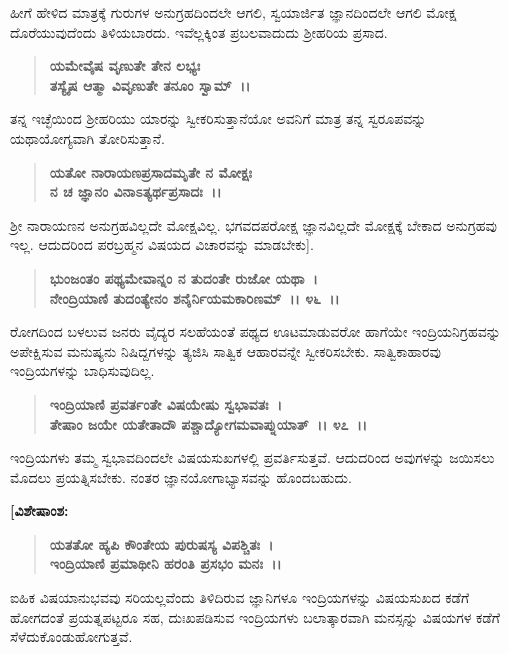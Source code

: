 ಹೀಗೆ ಹೇಳಿದ ಮಾತ್ರಕ್ಕೆ ಗುರುಗಳ ಅನುಗ್ರಹದಿಂದಲೇ ಆಗಲಿ, ಸ್ವಯಾರ್ಜಿತ ಜ್ಞಾನದಿಂದಲೇ ಆಗಲಿ ಮೋಕ್ಷ ದೊರೆಯುವುದೆಂದು ತಿಳಿಯಬಾರದು. ಇವೆಲ್ಲಕ್ಕಿಂತ ಪ್ರಬಲ\-ವಾದುದು ಶ‍್ರೀಹರಿಯ ಪ್ರಸಾದ.

\begin{verse}
\textbf{ಯಮೇವೈಷ ವೃಣುತೇ ತೇನ ಲಭ್ಯಃ}\\\textbf{ತಸ್ಯೈಷ ಆತ್ಮಾ ವಿವೃಣುತೇ ತನೂಂ ಸ್ವಾಮ್~।।} 
\end{verse}

ತನ್ನ ಇಚ್ಛೆಯಿಂದ ಶ‍್ರೀಹರಿಯು ಯಾರನ್ನು ಸ್ವೀಕರಿಸುತ್ತಾನೆಯೋ ಅವನಿಗೆ ಮಾತ್ರ ತನ್ನ ಸ್ವರೂಪವನ್ನು ಯಥಾಯೋಗ್ಯವಾಗಿ ತೋರಿಸುತ್ತಾನೆ.

\begin{verse}
\textbf{ಯತೋ ನಾರಾಯಣಪ್ರಸಾದಮೃತೇ ನ ಮೋಕ್ಷಃ}\\\textbf{ನ ಚ ಜ್ಞಾನಂ ವಿನಾಽತ್ಯರ್ಥಪ್ರಸಾದಃ~।।} 
\end{verse}

ಶ‍್ರೀ ನಾರಾಯಣನ ಅನುಗ್ರಹವಿಲ್ಲದೇ ಮೋಕ್ಷವಿಲ್ಲ. ಭಗವದಪರೋಕ್ಷ ಜ್ಞಾನವಿಲ್ಲದೇ ಮೋಕ್ಷಕ್ಕೆ ಬೇಕಾದ ಅನುಗ್ರಹವು ಇಲ್ಲ. ಆದುದರಿಂದ ಪರಬ್ರಹ್ಮನ ವಿಷಯದ ವಿಚಾರವನ್ನು ಮಾಡಬೇಕು].

\begin{verse}
\textbf{ಭುಂಜಂತಂ ಪಥ್ಯಮೇವಾನ್ನಂ ನ ತುದಂತೇ ರುಜೋ ಯಥಾ~।}\\\textbf{ನೇಂದ್ರಿಯಾಣಿ ತುದಂತ್ಯೇನಂ ಶನೈರ್ನಿಯಮಕಾರಿಣಮ್~।। ೪೬~।।}
\end{verse}

ರೋಗದಿಂದ ಬಳಲುವ ಜನರು ವೈದ್ಯರ ಸಲಹೆಯಂತೆ ಪಥ್ಯದ ಊಟಮಾಡುವರೋ ಹಾಗೆಯೇ ಇಂದ್ರಿಯನಿಗ್ರಹವನ್ನು ಅಪೇಕ್ಷಿಸುವ ಮನುಷ್ಯನು ನಿಷಿದ್ದಗಳನ್ನು ತ್ಯಜಿಸಿ ಸಾತ್ವಿಕ ಆಹಾರವನ್ನೇ ಸ್ವೀಕರಿಸಬೇಕು. ಸಾತ್ವಿಕಾಹಾರವು ಇಂದ್ರಿಯಗಳನ್ನು ಬಾಧಿಸುವುದಿಲ್ಲ.

\begin{verse}
\textbf{ಇಂದ್ರಿಯಾಣಿ ಪ್ರವರ್ತಂತೇ ವಿಷಯೇಷು ಸ್ವಭಾವತಃ~।}\\\textbf{ತೇಷಾಂ ಜಯೇ ಯತೇತಾದೌ ಪಶ್ಚಾದ್ಯೋಗಮವಾಪ್ನುಯಾತ್~।। ೪೭~।।}
\end{verse}

ಇಂದ್ರಿಯಗಳು ತಮ್ಮ ಸ್ವಭಾವದಿಂದಲೇ ವಿಷಯಸುಖಗಳಲ್ಲಿ ಪ್ರವರ್ತಿಸುತ್ತವೆ. ಆದುದರಿಂದ ಅವುಗಳನ್ನು ಜಯಿಸಲು ಮೊದಲು ಪ್ರಯತ್ನಿಸಬೇಕು. ನಂತರ ಜ್ಞಾನಯೋಗಾಭ್ಯಾಸವನ್ನು ಹೊಂದಬಹುದು.

\begin{flushleft}
\textbf{[ವಿಶೇಷಾಂಶ:}
\end{flushleft}

\begin{verse}
\textbf{ಯತತೋ ಹ್ಯಪಿ ಕೌಂತೇಯ ಪುರುಷಸ್ಯ ವಿಪಶ್ಚಿತಃ~।}\\\textbf{ಇಂದ್ರಿಯಾಣಿ ಪ್ರಮಾಥೀನಿ ಹರಂತಿ ಪ್ರಸಭಂ ಮನಃ~।।} 
\end{verse}

ಐಹಿಕ ವಿಷಯಾನುಭವವು ಸರಿಯಲ್ಲವೆಂದು ತಿಳಿದಿರುವ ಜ್ಞಾನಿಗಳೂ ಇಂದ್ರಿಯಗಳನ್ನು ವಿಷಯಸುಖದ ಕಡೆಗೆ ಹೋಗದಂತೆ ಪ್ರಯತ್ನಪಟ್ಟರೂ ಸಹ, ದುಃಖಪಡಿಸುವ ಇಂದ್ರಿಯಗಳು ಬಲಾತ್ಕಾರವಾಗಿ ಮನಸ್ಸನ್ನು ವಿಷಯಗಳ ಕಡೆಗೆ ಸೆಳೆದುಕೊಂಡುಹೋಗುತ್ತವೆ.

